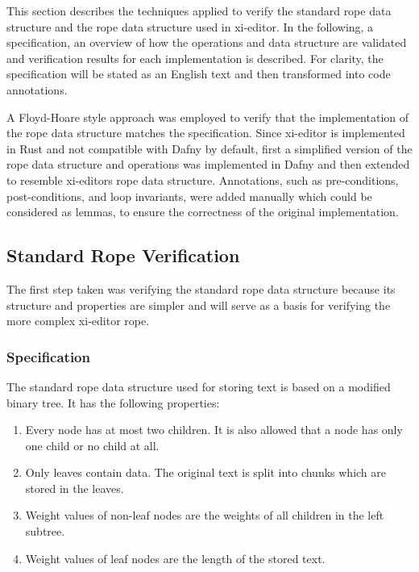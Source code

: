 This section describes the techniques applied to verify the standard rope data structure and the rope data structure used in xi-editor.
In the following, a specification, an overview of how the operations and data structure are validated and verification results for each implementation is described.
For clarity, the specification will be stated as an English text and then transformed into code annotations.

A Floyd-Hoare style approach was employed to verify that the implementation of the rope data structure matches the specification.
Since xi-editor is implemented in Rust and not compatible with Dafny by default, first a simplified version of the rope data structure and operations was implemented in Dafny and then extended to resemble xi-editors rope data structure.
Annotations, such as pre-conditions, post-conditions, and loop invariants, were added manually which could be considered as lemmas, to ensure the correctness of the original implementation.

\subsection{Standard Rope Verification}

The first step taken was verifying the standard rope data structure because its structure and properties are simpler and will serve as a basis for verifying the more complex xi-editor rope.

\subsubsection{Specification}

The standard rope data structure used for storing text is based on a modified binary tree.
It has the following properties:

\begin{enumerate}
  \item Every node has at most two children. It is also allowed that a node has only one child or no child at all.
  \item Only leaves contain data. The original text is split into chunks which are stored in the leaves.
  \item Weight values of non-leaf nodes are the weights of all children in the left subtree.
  \item Weight values of leaf nodes are the length of the stored text.
\end{enumerate}

